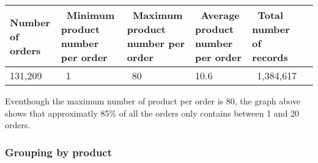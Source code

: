 \documentclass[11pt]{article}
\begin{document}
\begin{longtable}[]{@{}llllll@{}}
\toprule
\begin{minipage}[b]{0.02\columnwidth}\raggedright
Number of orders\strut
\end{minipage} & \begin{minipage}[b]{0.02\columnwidth}\raggedright
~Minimum product number per order\strut
\end{minipage} & \begin{minipage}[b]{0.02\columnwidth}\raggedright
~Maximum product number per order\strut
\end{minipage} & \begin{minipage}[b]{0.02\columnwidth}\raggedright
~Average product number per order\strut
\end{minipage} & \begin{minipage}[b]{0.02\columnwidth}\raggedright
~Total number of records~\strut
\end{minipage} & \begin{minipage}[b]{0.02\columnwidth}\raggedright
\strut
\end{minipage}\tabularnewline
\midrule
\endhead
\begin{minipage}[t]{0.02\columnwidth}\raggedright
131,209\strut
\end{minipage} & \begin{minipage}[t]{0.02\columnwidth}\raggedright
~1\strut
\end{minipage} & \begin{minipage}[t]{0.02\columnwidth}\raggedright
~80\strut
\end{minipage} & \begin{minipage}[t]{0.02\columnwidth}\raggedright
10.6\strut
\end{minipage} & \begin{minipage}[t]{0.02\columnwidth}\raggedright
~1,384,617\strut
\end{minipage} & \begin{minipage}[t]{0.02\columnwidth}\raggedright
\strut
\end{minipage}\tabularnewline
\bottomrule
\end{longtable}

Eventhough the maximum number of product per order is 80, the graph
above shows that approximatly 85\% of all the orders only contains
between 1 and 20 orders.

    \hypertarget{grouping-by-product}{%
\subsubsection{Grouping by product}\label{grouping-by-product}}
\end{document}

